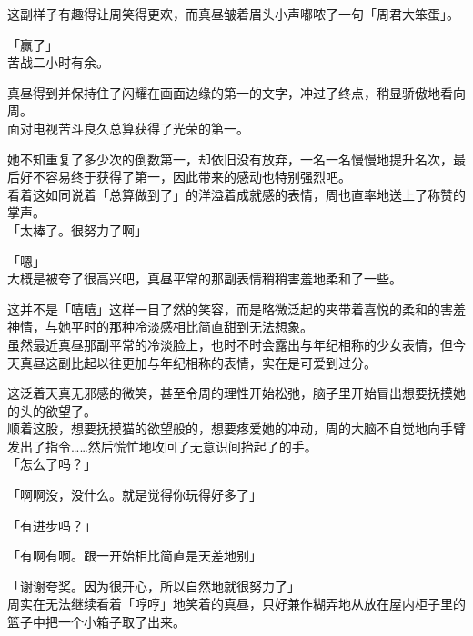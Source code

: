 这副样子有趣得让周笑得更欢，而真昼皱着眉头小声嘟哝了一句「周君大笨蛋」。\\

\vspace{2\baselineskip}

「赢了」\\

苦战二小时有余。

真昼得到并保持住了闪耀在画面边缘的第一的文字，冲过了终点，稍显骄傲地看向周。\\

面对电视苦斗良久总算获得了光荣的第一。

她不知重复了多少次的倒数第一，却依旧没有放弃，一名一名慢慢地提升名次，最后好不容易终于获得了第一，因此带来的感动也特别强烈吧。\\

看着这如同说着「总算做到了」的洋溢着成就感的表情，周也直率地送上了称赞的掌声。\\

「太棒了。很努力了啊」

「嗯」\\

大概是被夸了很高兴吧，真昼平常的那副表情稍稍害羞地柔和了一些。

这并不是「嘻嘻」这样一目了然的笑容，而是略微泛起的夹带着喜悦的柔和的害羞神情，与她平时的那种冷淡感相比简直甜到无法想象。\\

虽然最近真昼那副平常的冷淡脸上，也时不时会露出与年纪相称的少女表情，但今天真昼这副比起以往更加与年纪相称的表情，实在是可爱到过分。

这泛着天真无邪感的微笑，甚至令周的理性开始松弛，脑子里开始冒出想要抚摸她的头的欲望了。\\

顺着这股，想要抚摸猫的欲望般的，想要疼爱她的冲动，周的大脑不自觉地向手臂发出了指令……然后慌忙地收回了无意识间抬起了的手。\\

「怎么了吗？」

「啊啊没，没什么。就是觉得你玩得好多了」

「有进步吗？」

「有啊有啊。跟一开始相比简直是天差地别」

「谢谢夸奖。因为很开心，所以自然地就很努力了」\\

周实在无法继续看着「哼哼」地笑着的真昼，只好兼作糊弄地从放在屋内柜子里的篮子中把一个小箱子取了出来。\\

